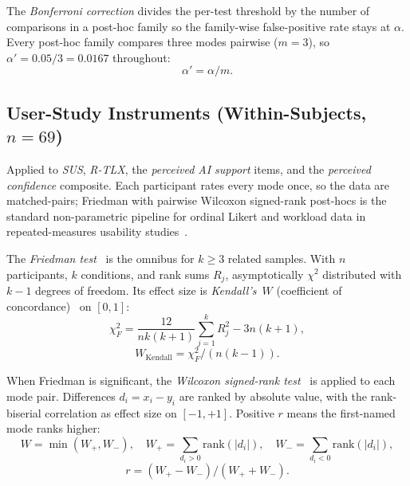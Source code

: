 The \emph{Bonferroni correction} divides the per-test threshold by the number of comparisons in a post-hoc family so the family-wise false-positive rate stays at $\alpha$.
Every post-hoc family compares three modes pairwise ($m = 3$), so $\alpha' = 0.05 / 3 = 0.0167$ throughout:
\begin{equation}
\alpha' = \alpha / m.
\end{equation}
\bigskip
\bigskip

\subsection{User-Study Instruments (Within-Subjects, $n = 69$)}

Applied to \textit{SUS}, \textit{R-TLX}, the \textit{perceived AI support} items, and the \textit{perceived confidence} composite.
Each participant rates every mode once, so the data are matched-pairs; Friedman with pairwise Wilcoxon signed-rank post-hocs is the standard non-parametric pipeline for ordinal Likert and workload data in repeated-measures usability studies~\cite{SauroLewis2016}.

The \emph{Friedman test}~\cite{Friedman1937} is the omnibus for $k \geq 3$ related samples. With $n$ participants, $k$ conditions, and rank sums $R_j$,
asymptotically $\chi^2$ distributed with $k - 1$ degrees of freedom. Its effect size is \emph{Kendall's~$W$} (coefficient of concordance)~\cite{Kendall1939} on $[0, 1]$:
\begin{equation}
\chi^2_F = \frac{12}{n k (k+1)} \sum_{j=1}^{k} R_j^2 - 3 n (k+1),
\end{equation}
\begin{equation}
W_{\mathrm{Kendall}} = \chi^2_F / (n (k - 1)).
\end{equation}

When Friedman is significant, the \emph{Wilcoxon signed-rank test}~\cite{Wilcoxon1945} is applied to each mode pair. Differences $d_i = x_i - y_i$ are ranked by absolute value,
with the rank-biserial correlation as effect size on $[-1, +1]$. Positive $r$ means the first-named mode ranks higher:
\begin{equation}
W = \min(W_+, W_-),
\quad W_+ = \!\!\!\sum_{d_i > 0}\!\! \mathrm{rank}(|d_i|), \quad
W_- = \!\!\!\sum_{d_i < 0}\!\! \mathrm{rank}(|d_i|),
\end{equation}
\begin{equation}
r = (W_+ - W_-) / (W_+ + W_-).
\end{equation}


